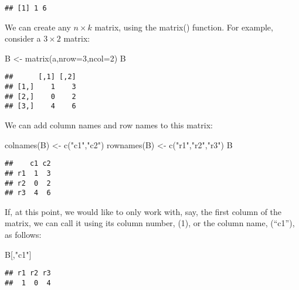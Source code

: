\documentclass[
  oneside]{book}
\newenvironment{Shaded}{\begin{snugshade}}{\end{snugshade}}
\newcommand{\AttributeTok}[1]{\textcolor[rgb]{0.77,0.63,0.00}{#1}}
\newcommand{\DecValTok}[1]{\textcolor[rgb]{0.00,0.00,0.81}{#1}}
\newcommand{\FunctionTok}[1]{\textcolor[rgb]{0.00,0.00,0.00}{#1}}
\newcommand{\NormalTok}[1]{#1}
\newcommand{\OtherTok}[1]{\textcolor[rgb]{0.56,0.35,0.01}{#1}}
\newcommand{\StringTok}[1]{\textcolor[rgb]{0.31,0.60,0.02}{#1}}
\begin{document}
\begin{verbatim}
## [1] 1 6
\end{verbatim}

We can create any \(n \times k\) matrix, using the matrix() function. For example, consider a \(3 \times 2\) matrix:

\begin{Shaded}
\begin{Highlighting}[]
\NormalTok{B }\OtherTok{\textless{}{-}} \FunctionTok{matrix}\NormalTok{(a,}\AttributeTok{nrow=}\DecValTok{3}\NormalTok{,}\AttributeTok{ncol=}\DecValTok{2}\NormalTok{)}
\NormalTok{B}
\end{Highlighting}
\end{Shaded}

\begin{verbatim}
##      [,1] [,2]
## [1,]    1    3
## [2,]    0    2
## [3,]    4    6
\end{verbatim}

We can add column names and row names to this matrix:

\begin{Shaded}
\begin{Highlighting}[]
\FunctionTok{colnames}\NormalTok{(B) }\OtherTok{\textless{}{-}} \FunctionTok{c}\NormalTok{(}\StringTok{"c1"}\NormalTok{,}\StringTok{"c2"}\NormalTok{)}
\FunctionTok{rownames}\NormalTok{(B) }\OtherTok{\textless{}{-}} \FunctionTok{c}\NormalTok{(}\StringTok{"r1"}\NormalTok{,}\StringTok{"r2"}\NormalTok{,}\StringTok{"r3"}\NormalTok{)}
\NormalTok{B}
\end{Highlighting}
\end{Shaded}

\begin{verbatim}
##    c1 c2
## r1  1  3
## r2  0  2
## r3  4  6
\end{verbatim}

If, at this point, we would like to only work with, say, the first column of the matrix, we can call it using its column number, (1), or the column name, (``c1''), as follows:

\begin{Shaded}
\begin{Highlighting}[]
\NormalTok{B[,}\StringTok{"c1"}\NormalTok{]}
\end{Highlighting}
\end{Shaded}

\begin{verbatim}
## r1 r2 r3 
##  1  0  4
\end{verbatim}
\end{document}
